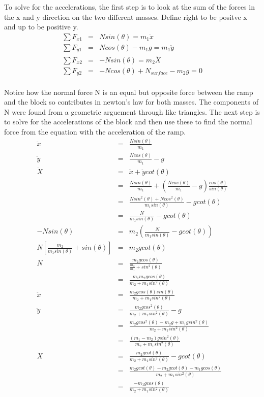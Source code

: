 \documentclass[11pt]{amsart}
\begin{document}
To solve for the accelerations, the first step is to look at the sum of the forces in the x and y direction on the two different masses. Define right to be positve x and up to be positive y.\\ 
\begin{eqnarray*} 
\sum{F_{x1}} &=& Nsin(\theta) = m_{1}\ddot{x} \\
\sum{F_{y1}} &=& Ncos(\theta)-m_{1}g = m_{1}\ddot{y} \\
\sum{F_{x2}} &=& -Nsin(\theta) = m_{2}\ddot{X} \\
\sum{F_{y2}} &=& -Ncos(\theta)+N_{surface}-m_{2}g=0 
\end{eqnarray*} \\
Notice how the normal force N is an equal but opposite force between the ramp and the block so contributes in newton's law for both masses. The components of N were found from a geometric arguement through like triangles. The next step is to solve for the accelerations of the block and then use these to find the normal force from the equation with the acceleration of the ramp. \\
\begin{eqnarray*}
\ddot{x} &=& \frac{Nsin(\theta)}{m_{1}} \\
\ddot{y} &=& \frac{Ncos(\theta)}{m_{1}}-g \\
\ddot{X} &=& \ddot{x}+\ddot{y}cot(\theta) \\
&=& \frac{Nsin(\theta)}{m_{1}} + (\frac{Ncos(\theta)}{m_{1}}-g)\frac{cos(\theta)}{sin(\theta)} \\
&=& \frac{Nsin^{2}(\theta)+Ncos^{2}(\theta)}{m_{1}sin(\theta)}-gcot(\theta) \\
&=& \frac{N}{m_{1}sin(\theta)}-gcot(\theta) \\
-Nsin(\theta) &=& m_{2}(\frac{N}{m_{1}sin(\theta)}-gcot(\theta)) \\
N[\frac{m_{2}}{m_{1}sin(\theta)}+sin(\theta)] &=& m_{2}gcot(\theta) \\
N &=& \frac{m_{2}gcos(\theta)}{\frac{m_{2}}{m_{1}}+sin^{2}(\theta)} \\
&=& \frac{m_{1}m_{2}gcos(\theta)}{m_{2}+m_{1}sin^{2}(\theta)} \\
\ddot{x} &=& \frac{m_{2}gcos(\theta)sin(\theta)}{m_{2}+m_{1}sin^{2}(\theta)} \\
\ddot{y} &=& \frac{m_{2}gcos^{2}(\theta)}{m_{2}+m_{1}sin^{2}(\theta)} -g \\
&=& \frac{m_{2}gcos^{2}(\theta)-m_{2}g+m_{1}gsin^{2}(\theta)}{m_{2}+m_{1}sin^{2}(\theta)} \\
&=& \frac{(m_{1}-m_{2})gsin^{2}(\theta)}{m_{2}+m_{1}sin^{2}(\theta)} \\
\ddot{X} &=& \frac{m_{2}gcot(\theta)}{m_{2}+m_{1}sin^{2}(\theta)}-gcot(\theta) \\
&=& \frac{m_{2}gcot(\theta)-m_{2}gcot(\theta)-m_{1}gcos(\theta)}{m_{2}+m_{1}sin^{2}(\theta)} \\
&=& \frac{-m_{1}gcos(\theta)}{m_{2}+m_{1}sin^{2}(\theta)} 
\end{eqnarray*} \\
\end{document}
